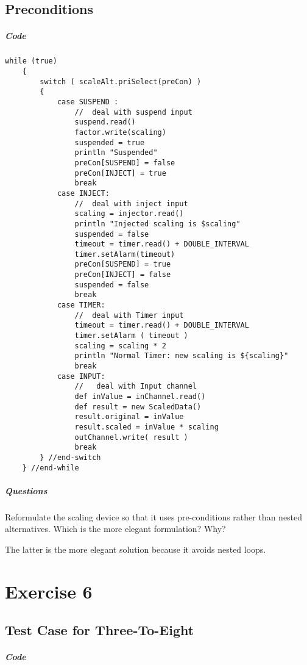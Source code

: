 \documentclass[10pt, a4paper]{article}
\begin{document}
	
	\subsection{Preconditions}
	
	\subparagraph{Code} \hfill
	
	\begin{lstlisting}[caption = "Scale.groovy"]
	while (true)
	{
		switch ( scaleAlt.priSelect(preCon) )
		{
			case SUSPEND :
				//  deal with suspend input      
				suspend.read()
				factor.write(scaling)
				suspended = true
				println "Suspended"		
				preCon[SUSPEND] = false
				preCon[INJECT] = true  
				break
			case INJECT:
				//  deal with inject input
				scaling = injector.read()
				println "Injected scaling is $scaling"
				suspended = false
				timeout = timer.read() + DOUBLE_INTERVAL
				timer.setAlarm(timeout)
				preCon[SUSPEND] = true
				preCon[INJECT] = false
				suspended = false
				break
			case TIMER:
				//  deal with Timer input
				timeout = timer.read() + DOUBLE_INTERVAL
				timer.setAlarm ( timeout )
				scaling = scaling * 2
				println "Normal Timer: new scaling is ${scaling}"
				break
			case INPUT:
				//   deal with Input channel 
				def inValue = inChannel.read()
				def result = new ScaledData()
				result.original = inValue
				result.scaled = inValue * scaling
				outChannel.write( result )
				break
		} //end-switch
	} //end-while		\end{lstlisting}
	
	\subparagraph{Questions} \hfill
      Reformulate the scaling device so that it uses pre-conditions rather than nested alternatives.  Which is the more elegant formulation? Why?
   
   The latter is the more elegant solution because it avoids nested loops.
   
   	\setcounter{section}{6}
   \section*{Exercise 6}
   
   \setcounter{subsection}{0}
   \subsection{Test Case for Three-To-Eight} \hfill
   
   \subparagraph{Code} \hfill
   
\end{document}

